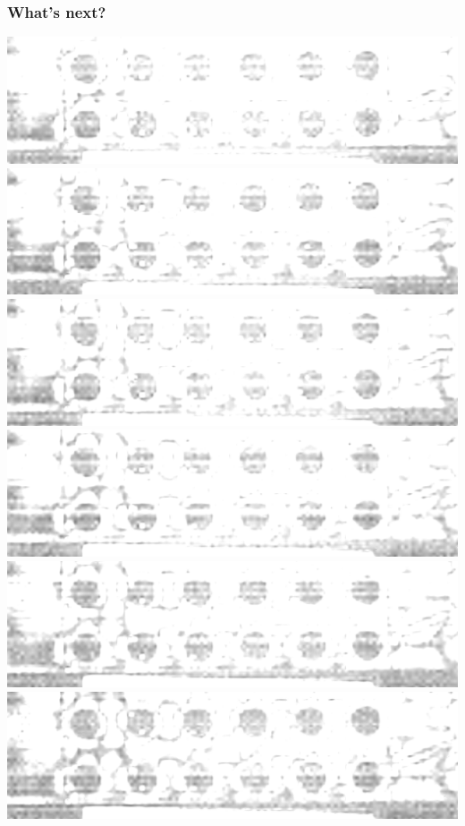 \documentclass{beamer}
\begin{document}
\begin{frame}
    \frametitle{What's next?}

        \includegraphics[height=0.023\textheight]{spatial-denoised/wavelet_den_1.png}
        \includegraphics[height=0.023\textheight]{spatial-denoised/wavelet_den_2.png}
        \includegraphics[height=0.023\textheight]{spatial-denoised/wavelet_den_3.png}
        \includegraphics[height=0.023\textheight]{spatial-denoised/wavelet_den_4.png}
        \includegraphics[height=0.023\textheight]{spatial-denoised/wavelet_den_5.png}
        \includegraphics[height=0.023\textheight]{spatial-denoised/wavelet_den_6.png}

\end{frame}
\end{document}
